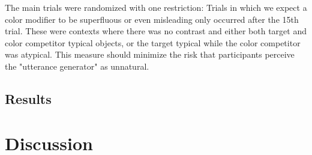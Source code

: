 \documentclass[10pt,letterpaper]{article}
\begin{document}
The main trials were randomized with one restriction: Trials in which we expect a color modifier to be superfluous or even misleading only occurred after the 15th trial. These were contexts where there was no contrast and either both target and color competitor typical objects, or the target typical while the color competitor was atypical. This measure should minimize the risk that participants perceive the "utterance generator" as unnatural.


\subsection{Results}

\section{Discussion}


\end{document}
